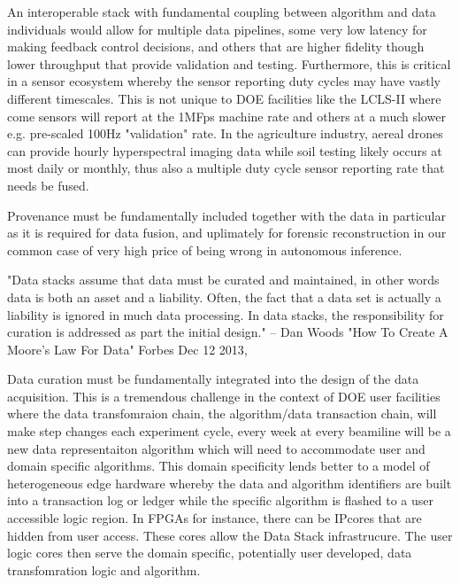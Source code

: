 \documentclass{article}
\begin{document}
An interoperable stack with fundamental coupling between algorithm and data individuals would allow for multiple data pipelines, some very low latency for making feedback control decisions, and others that are higher fidelity though lower throughput that provide validation and testing.  Furthermore, this is critical in a sensor ecosystem whereby the sensor reporting duty cycles may have vastly different timescales. 
This is not unique to DOE facilities like the LCLS-II where come sensors will report at the 1MFps machine rate and others at a much slower e.g. pre-scaled 100Hz "validation" rate.  
In the agriculture industry, aereal drones can provide hourly hyperspectral imaging data while soil testing likely occurs at most daily or monthly, thus also a multiple duty cycle sensor reporting rate that needs be fused.

Provenance must be fundamentally included together with the data in particular as it is required for data fusion, and uplimately for forensic reconstruction in our common case of very high price of being wrong in autonomous inference.

"Data stacks assume that data must be curated and maintained, in other words data is both
an asset and a liability. Often, the fact that a data set is actually a liability is ignored in
much data processing. In data stacks, the responsibility for curation is addressed as part
the initial design." -- Dan Woods "How To Create A Moore's Law For Data" Forbes Dec 12 2013, \cite{Woods2013} %

Data curation must be fundamentally integrated into the design of the data acquisition.  This is a tremendous challenge in the context of DOE user facilities where the data transfomraion chain, the algorithm/data transaction chain, will make step changes each experiment cycle, every week at every beamiline will be a new data representaiton algorithm which will need to accommodate user and domain specific algorithms.
This domain specificity lends better to a model of heterogeneous edge hardware whereby the data and algorithm identifiers are built into a transaction log or ledger while the specific algorithm is flashed to a user accessible logic region.
In FPGAs for instance, there can be IPcores that are hidden from user access.  These cores allow the Data Stack infrastrucure.  The user logic cores then serve the domain specific, potentially user developed, data transfomration logic and algorithm.
\end{document}

